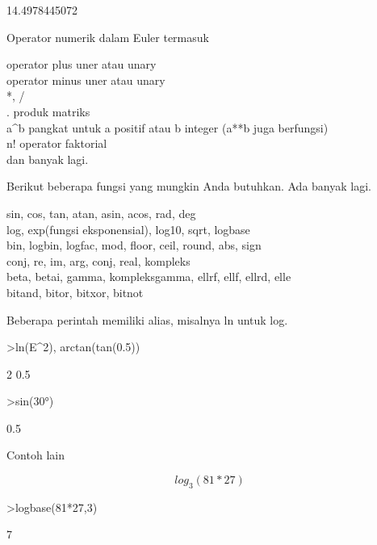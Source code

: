 \documentclass[12pt,arial,letterpaper]{book}
\begin{document}
\begin{euleroutput}
  14.4978445072
\end{euleroutput}
\begin{eulercomment}
Operator numerik dalam Euler termasuk

operator plus uner atau unary\\
operator minus uner atau unary\\
*, /\\
. produk matriks\\
a\textasciicircum{}b pangkat untuk a positif atau b integer (a**b juga berfungsi)\\
n! operator faktorial\\
dan banyak lagi.

Berikut beberapa fungsi yang mungkin Anda butuhkan. Ada banyak lagi.

sin, cos, tan, atan, asin, acos, rad, deg\\
log, exp(fungsi eksponensial), log10, sqrt, logbase\\
bin, logbin, logfac, mod, floor, ceil, round, abs, sign\\
conj, re, im, arg, conj, real, kompleks\\
beta, betai, gamma, kompleksgamma, ellrf, ellf, ellrd, elle\\
bitand, bitor, bitxor, bitnot

Beberapa perintah memiliki alias, misalnya ln untuk log.
\end{eulercomment}
\begin{eulerprompt}
>ln(E^2), arctan(tan(0.5))
\end{eulerprompt}
\begin{euleroutput}
  2
  0.5
\end{euleroutput}
\begin{eulerprompt}
>sin(30°)
\end{eulerprompt}
\begin{euleroutput}
  0.5
\end{euleroutput}
\begin{eulercomment}
Contoh lain\\
\end{eulercomment}
\begin{eulerformula}
\[
log_3(81*27)
\]
\end{eulerformula}
\begin{eulerprompt}
>logbase(81*27,3)
\end{eulerprompt}
\begin{euleroutput}
  7
\end{euleroutput}
\end{document}
